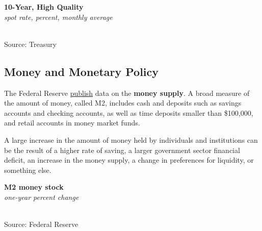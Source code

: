 \documentclass{report}
\makeatletter
\newcommand{\tbllink}[1]{\href{https://raw.githubusercontent.com/bdecon/US-chartbook/master/chartbook/data/#1}{\faTable}}
\newcommand*\short[1]{\expandafter\@gobbletwo\number\numexpr#1\relax}
\newcommand{\dateaxisticks}{
		date coordinates in=x, axis line style={draw=none},
		xmax={2022-01-30},
		max space between ticks=40,	    
		xtick={{1990-01-01}, {1992-01-01}, {1994-01-01}, 
			{1996-01-01}, {1998-01-01}, {2000-01-01}, 
			{2002-01-01}, {2004-01-01}, {2006-01-01},
			{2008-01-01}, {2010-01-01}, {2012-01-01}, {2014-01-01},
		    {2016-01-01}, {2018-01-01}, {2020-01-01}, {2022-01-01}},
		minor xtick={{1989-01-01}, {1991-01-01}, {1993-01-01},
			{1995-01-01}, {1997-01-01}, {1999-01-01}, 
			{2001-01-01}, {2003-01-01}, {2005-01-01}, {2007-01-01},
		    {2009-01-01}, {2011-01-01}, {2013-01-01}, {2015-01-01},
		    {2017-01-01}, {2019-01-01}, {2021-01-01}},
		enlarge y limits={0.06}, enlarge x limits={0.01},
		}
\newcommand{\shdateaxisticks}{
		date coordinates in=x, axis line style={draw=none},
		xmax={2022-01-30},
		max space between ticks=40,	    
		xtick={{1990-01-01}, {1995-01-01}, {2000-01-01}, 
			{2005-01-01}, {2010-01-01}, {2015-01-01}, {2020-01-01}},
		minor xtick={},
		enlarge y limits={0.06}, enlarge x limits={0.01},
		}
\newcommand{\bbar}[2]{extra #1 ticks = {{#2}}, extra #1 tick labels = ,
		extra #1 tick style = {grid=major, grid style={thick, black!25}},}
\newcommand{\stdline}[4]{\addplot[very thick, no markers, color=#1] 
		table [x=#2, y=#3, col sep=comma] {#4};	}
\newcommand{\thickline}[4]{\addplot[ultra thick, no markers, color=#1] 
		table [x=#2, y=#3, col sep=comma] {#4};	}
\newcommand{\rbars}{
		\fill[color=black!10] (axis cs:{1990-07-01},\pgfkeysvalueof{/pgfplots/ymin}) rectangle 
			(axis cs:{1991-03-01}, \pgfkeysvalueof{/pgfplots/ymax});
		\fill[color=black!10] (axis cs:{2007-12-01},\pgfkeysvalueof{/pgfplots/ymin}) rectangle 
			(axis cs:{2009-07-01}, \pgfkeysvalueof{/pgfplots/ymax});
		\fill[color=black!10] (axis cs:{2001-03-01},\pgfkeysvalueof{/pgfplots/ymin}) rectangle 
			(axis cs:{2001-11-01}, \pgfkeysvalueof{/pgfplots/ymax});
		\fill[color=black!10] (axis cs:{2020-02-01},\pgfkeysvalueof{/pgfplots/ymin}) rectangle 
			(axis cs:{2020-05-01}, \pgfkeysvalueof{/pgfplots/ymax});}
\makeatother
\begin{document}
{{\begin{minipage}{0.27\textwidth}
\end{minipage}\hspace{8mm} \begin{minipage}{0.43\textwidth}
\normalsize \textbf{10-Year, High Quality}\\
\footnotesize{\textit{spot rate, percent, monthly average}}\\
\hspace*{-2mm} \\
\footnotesize{Source: Treasury} \hfill \tbllink{hqcb.csv}
\end{minipage}
\newpage
\begin{minipage}{0.76\textwidth}
\subsection*{\color{black!70} \seriffont Money and Monetary Policy}
\small The Federal Reserve \href{https://www.federalreserve.gov/releases/h6/current/default.htm}{publish} data on the \textbf{money supply}. A broad measure of the amount of money, called M2, includes cash and deposits such as savings accounts and checking accounts, as well as time deposits smaller than \$100,000, and retail accounts in money market funds. 

A large increase in the amount of money held by individuals and institutions can be the result of a higher rate of saving, a larger government sector financial deficit, an increase in the money supply, a change in preferences for liquidity, or something else. 
\vspace{2mm}

\normalsize \textbf{M2 money stock}\\
\footnotesize{\textit{one-year percent change}}\\
\hspace*{-2mm} \\
\footnotesize{Source: Federal Reserve} \hfill \tbllink{m2.csv}
\end{minipage}
\newpage
\begin{minipage}{0.76\textwidth}

\end{minipage}}}
\end{document}

